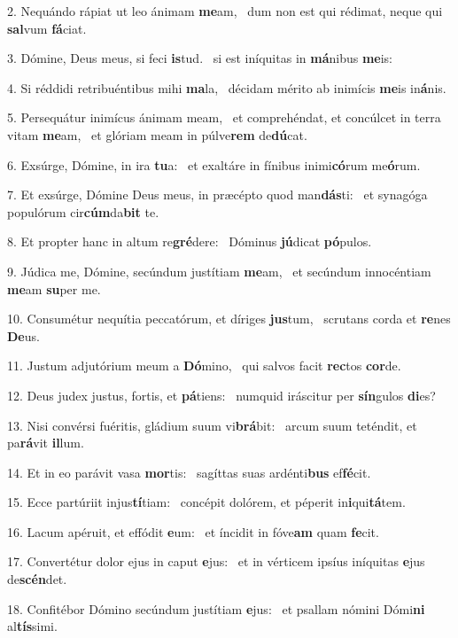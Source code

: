 2. Nequándo rápiat ut leo ánimam \textbf{me}am, \ast\  dum non est qui rédimat, neque qui \textbf{sal}vum \textbf{fá}ciat.\

3. Dómine, Deus meus, si feci \textbf{is}tud. \ast\  si est iníquitas in \textbf{má}nibus \textbf{me}is:\

4. Si réddidi retribuéntibus mihi \textbf{ma}la, \ast\  décidam mérito ab inimícis \textbf{me}is in\textbf{á}nis.\

5. Persequátur inimícus ánimam meam, \dag\  et comprehéndat, et concúlcet in terra vitam \textbf{me}am, \ast\  et glóriam meam in púlve\textbf{rem} de\textbf{dú}cat.\

6. Exsúrge, Dómine, in ira \textbf{tu}a: \ast\  et exaltáre in fínibus inimi\textbf{có}rum me\textbf{ó}rum.\

7. Et exsúrge, Dómine Deus meus, in præcépto quod man\textbf{dás}ti: \ast\  et synagóga populórum cir\textbf{cúm}da\textbf{bit} te.\

8. Et propter hanc in altum re\textbf{gré}dere: \ast\  Dóminus \textbf{jú}dicat \textbf{pó}pulos.\

9. Júdica me, Dómine, secúndum justítiam \textbf{me}am, \ast\  et secúndum innocéntiam \textbf{me}am \textbf{su}per me.\

10. Consumétur nequítia peccatórum, et díriges \textbf{jus}tum, \ast\  scrutans corda et \textbf{re}nes \textbf{De}us.\

11. Justum adjutórium meum a \textbf{Dó}mino, \ast\  qui salvos facit \textbf{rec}tos \textbf{cor}de.\

12. Deus judex justus, fortis, et \textbf{pá}tiens: \ast\  numquid iráscitur per \textbf{sín}gulos \textbf{di}es?\

13. Nisi convérsi fuéritis, gládium suum vi\textbf{brá}bit: \ast\  arcum suum teténdit, et pa\textbf{rá}vit \textbf{il}lum.\

14. Et in eo parávit vasa \textbf{mor}tis: \ast\  sagíttas suas ardénti\textbf{bus} ef\textbf{fé}cit.\

15. Ecce partúriit injus\textbf{tí}tiam: \ast\  concépit dolórem, et péperit in\textbf{i}qui\textbf{tá}tem.\

16. Lacum apéruit, et effódit \textbf{e}um: \ast\  et íncidit in fóve\textbf{am} quam \textbf{fe}cit.\

17. Convertétur dolor ejus in caput \textbf{e}jus: \ast\  et in vérticem ipsíus iníquitas \textbf{e}jus de\textbf{scén}det.\

18. Confitébor Dómino secúndum justítiam \textbf{e}jus: \ast\  et psallam nómini Dómi\textbf{ni} al\textbf{tís}simi.\

